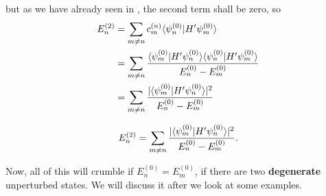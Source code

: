but as we have already seen in , the second term shall be zero, so
\begin{equation}
\begin{aligned}
E_n^{(2)}&=\sum_{m\neq n}c_m^{(n)}\langle \psi_n^{(0)} |H'\psi_m^{(0)} \rangle \\
&=\sum_{m\neq n}\frac{\langle\psi_m^{(0)} |H'\psi_n^{(0)} \rangle\langle\psi_n^{(0)} |H'\psi_m^{(0)} \rangle}{E_n^{(0)}-E_m^{(0)}}\\
&=\sum_{m\neq n}\frac{|\langle\psi_m^{(0)} |H'\psi_n^{(0)} \rangle|^2}{E_n^{(0)}-E_m^{(0)}}
\end{aligned}
\end{equation}
\begin{thrm}
\label{2ndecorr}
\begin{equation}
E_n^{(2)}=\sum_{m\neq n}\frac{|\langle\psi_m^{(0)} |H'\psi_n^{(0)} \rangle|^2}{E_n^{(0)}-E_m^{(0)}}.
\end{equation}
\end{thrm}
Now, all of this will crumble if $E_n^{(0)}=E_m^{(0)}$, \ie if there are two 
\textbf{degenerate} unperturbed states. We will discuss it after we look at some 
examples. 
